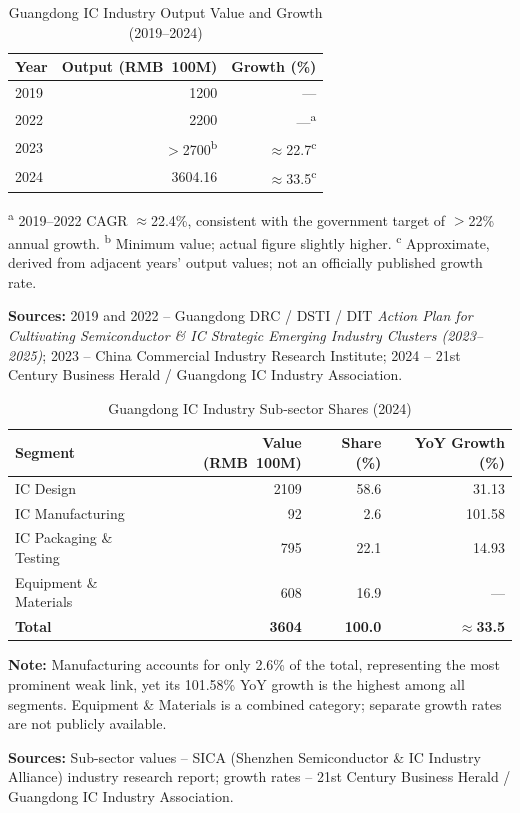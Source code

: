 \documentclass[12pt,a4paper]{article}
\newcommand{\tableHeaderRow}{\rowcolor{tealPrimary}\color{white}}
\newcommand{\tableOddRow}{\rowcolor{mintBG}}
\newcommand{\tableEvenRow}{\rowcolor{white}}
\begin{document}
\begin{table}[H]
\centering
\caption{Guangdong IC Industry Output Value and Growth (2019--2024)}
\label{tab:core}
\begin{tabular}{lrr}
\toprule
\tableHeaderRow
\textbf{Year} & \textbf{Output (RMB~100M)} & \textbf{Growth (\%)} \\
\midrule
\tableOddRow  2019 & 1200 & --- \\
\tableEvenRow 2022 & 2200 & ---\textsuperscript{a} \\
\tableOddRow  2023 & $>$2700\textsuperscript{b} & $\approx$22.7\textsuperscript{c} \\
\tableEvenRow 2024 & 3604.16 & $\approx$33.5\textsuperscript{c} \\
\bottomrule
\end{tabular}

\vspace{2pt}
{\footnotesize
\textsuperscript{a} 2019--2022 CAGR $\approx$22.4\%, consistent with the government
target of $>$22\% annual growth.
\textsuperscript{b} Minimum value; actual figure slightly higher.
\textsuperscript{c} Approximate, derived from adjacent years' output values; not
an officially published growth rate.

\textbf{Sources:} 2019 and 2022 -- Guangdong DRC / DSTI / DIT
\textit{Action Plan for Cultivating Semiconductor \& IC Strategic Emerging
Industry Clusters (2023--2025)}; 2023 -- China Commercial Industry Research
Institute; 2024 -- 21st Century Business Herald / Guangdong IC Industry
Association.}
\end{table}

\begin{table}[H]
\centering
\caption{Guangdong IC Industry Sub-sector Shares (2024)}
\label{tab:subsector2024}
\begin{tabular}{lrrr}
\toprule
\tableHeaderRow
\textbf{Segment} & \textbf{Value (RMB~100M)} & \textbf{Share (\%)} & \textbf{YoY Growth (\%)} \\
\midrule
\tableOddRow  IC Design & 2109 & 58.6 & 31.13 \\
\tableEvenRow IC Manufacturing & 92 & 2.6 & 101.58 \\
\tableOddRow  IC Packaging \& Testing & 795 & 22.1 & 14.93 \\
\tableEvenRow Equipment \& Materials & 608 & 16.9 & --- \\
\midrule
\tableOddRow  \textbf{Total} & \textbf{3604} & \textbf{100.0} & \textbf{$\approx$33.5} \\
\bottomrule
\end{tabular}

\vspace{2pt}
{\footnotesize
\textbf{Note:} Manufacturing accounts for only 2.6\% of the total, representing
the most prominent weak link, yet its 101.58\% YoY growth is the highest among
all segments. Equipment \& Materials is a combined category; separate growth
rates are not publicly available.

\textbf{Sources:} Sub-sector values -- SICA (Shenzhen Semiconductor \& IC Industry
Alliance) industry research report; growth rates -- 21st Century Business Herald
/ Guangdong IC Industry Association.}
\end{table}
\end{document}
